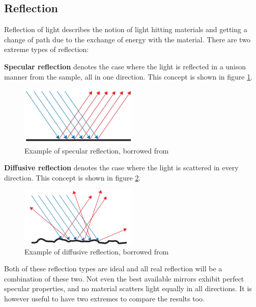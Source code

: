 \subsection{Reflection}
\label{sec:theory_reflection}
Reflection of light describes the notion of light hitting materials and getting a change of path due to the exchange of energy with the material. There are two extreme types of reflection:

\textbf{Specular reflection} denotes the case where the light is reflected in a unison manner from the sample, all in one direction. This concept is shown in figure \ref{fig:specular_reflection}.

\begin{figure}[h!]
    \centering
    \includegraphics[width=0.5\textwidth]{figures/theory/Specular-Reflection.png}
    \caption{Example of specular reflection, borrowed from \cite{SpecularReflectionOcean}}
    \label{fig:specular_reflection}
\end{figure}

\textbf{Diffusive reflection} denotes the case where the light is scattered in every direction. This concept is shown in figure \ref{fig:diffusive_reflection}.

\begin{figure}[h!]
    \centering
    \includegraphics[width=0.5\textwidth]{figures/theory/Diffuse-Reflection.png}
    \caption{Example of diffusive reflection, borrowed from \cite{DiffuseReflectionOcean}}
    \label{fig:diffusive_reflection}
\end{figure}

Both of these reflection types are ideal and all real reflection will be a combination of these two. Not even the best available mirrors exhibit perfect specular properties, and no material scatters light equally in all directions. It is however useful to have two extremes to compare the results too. 

